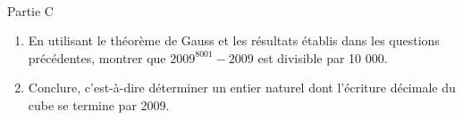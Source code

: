  
\begin{h3}Partie C\end{h3}
\begin{enumerate}
     \item
     En utilisant le théorème de Gauss et les résultats établis dans les questions précédentes, montrer que $2009^{8001}-2009$ est divisible par 10 000.
     \item
Conclure, c'est-à-dire déterminer un entier naturel dont l'écriture décimale du cube se termine par 2009. \end{enumerate}
\begin{corrige}
\end{corrige}
